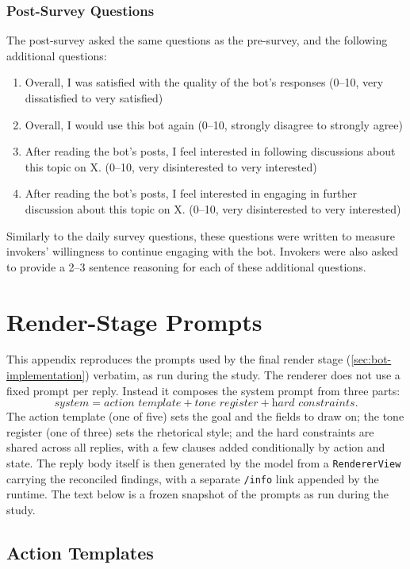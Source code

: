 \subsubsection{Post-Survey Questions}
The post-survey asked the same questions as the pre-survey, and the following additional questions:
\begin{enumerate}
    \item Overall, I was satisfied with the quality of the bot’s responses (0--10, very dissatisfied to very satisfied)
    \item Overall, I would use this bot again (0--10, strongly disagree to strongly agree)
    \item After reading the bot’s posts, I feel interested in following discussions about this topic on X. (0--10, very disinterested to very interested)
    \item After reading the bot’s posts, I feel interested in engaging in further discussion about this topic on X. (0--10, very disinterested to very interested)
\end{enumerate}
Similarly to the daily survey questions, these questions were written to measure invokers' willingness to continue engaging with the bot. Invokers were also asked to provide a 2--3 sentence reasoning for each of these additional questions.

\section{Render-Stage Prompts}\label{appendix:render-prompts}

This appendix reproduces the prompts used by the final render stage (\autoref{sec:bot-implementation}) verbatim, as run during the study. The renderer does not use a fixed prompt per reply. Instead it composes the system prompt from three parts:
\[
\textit{system} = \textit{action template} + \textit{tone register} + \textit{hard constraints}.
\]
The action template (one of five) sets the goal and the fields to draw on; the tone register (one of three) sets the rhetorical style; and the hard constraints are shared across all replies, with a few clauses added conditionally by action and state. The reply body itself is then generated by the model from a \texttt{RendererView} carrying the reconciled findings, with a separate \texttt{/info} link appended by the runtime. The text below is a frozen snapshot of the prompts as run during the study.

\subsection{Action Templates}

